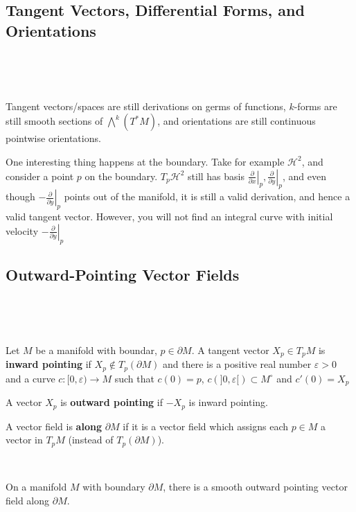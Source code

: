 \documentclass{article}
\begin{document}
\subsection{Tangent Vectors, Differential Forms, and Orientations}
\

\begin{remark}
  \

  Tangent vectors/spaces are still derivations on germs of functions, $k$-forms are still smooth sections of $\bigwedge^k(T^*M)$, and orientations are still continuous pointwise orientations.

  One interesting thing happens at the boundary. Take for example $\mathcal{H}^2$, and consider a point $p$ on the boundary. $T_p\mathcal{H}^2$ still has basis $\left.\frac{\partial}{\partial x}\right\vert_p, \left.\frac{\partial}{\partial y}\right\vert_p$, and even though $\left.-\frac{\partial}{\partial y}\right\vert_p$ points out of the manifold, it is still a valid derivation, and hence a valid tangent vector. However, you will not find an integral curve with initial velocity $\left.-\frac{\partial}{\partial y}\right\vert_p$
\end{remark}

\subsection{Outward-Pointing Vector Fields}
\

\begin{definition}
  \

  Let $M$ be a manifold with boundar, $p \in \partial M$. A tangent vector $X_p \in T_pM$ is \textbf{inward pointing} if $X_p \notin T_p(\partial M)$ and there is a positive real number $\varepsilon > 0$ and a curve $c: [0,\varepsilon) \to M$ such that $c(0) = p$, $c(]0,\varepsilon[) \subset M^\circ$ and $c'(0) = X_p$

  A vector $X_p$ is \textbf{outward pointing} if $-X_p$ is inward pointing.

  A vector field is \textbf{along} $\partial M$ if it is a vector field which assigns each $p \in M$ a vector in $T_pM$ (instead of $T_p(\partial M)$).
\end{definition}
\begin{proposition}
  \

  On a manifold $M$ with boundary $\partial M$, there is a smooth outward pointing vector field along $\partial M$.
\end{proposition}
\end{document}
